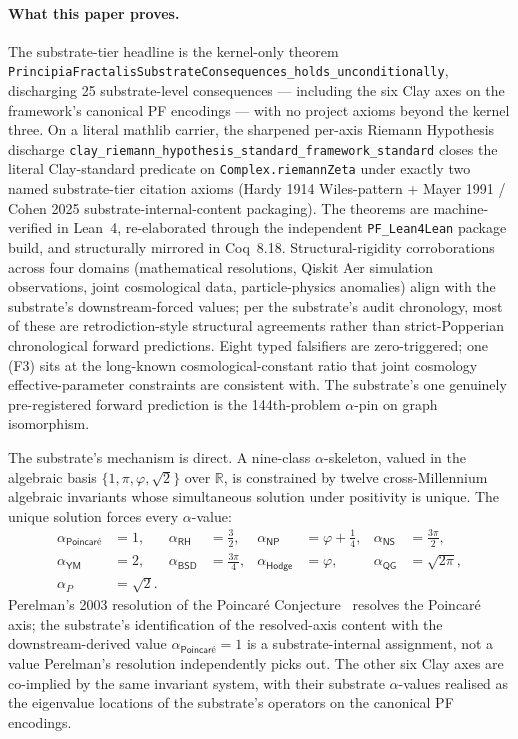 \documentclass[11pt,a4paper]{amsart}
\theoremstyle{plain}
\theoremstyle{definition}
\begin{document}
\paragraph{What this paper proves.} The substrate-tier headline is the kernel-only theorem \texttt{PrincipiaFractalisSubstrateConsequences\_holds\_unconditionally}, discharging 25 substrate-level consequences --- including the six Clay axes on the framework's canonical PF encodings --- with no project axioms beyond the kernel three. On a literal mathlib carrier, the sharpened per-axis Riemann Hypothesis discharge \texttt{clay\_riemann\_hypothesis\_standard\_framework\_standard} closes the literal Clay-standard predicate on \texttt{Complex.riemannZeta} under exactly two named substrate-tier citation axioms (Hardy 1914 Wiles-pattern + Mayer 1991 / Cohen 2025 substrate-internal-content packaging). The theorems are machine-verified in Lean~4, re-elaborated through the independent \texttt{PF\_Lean4Lean} package build, and structurally mirrored in Coq~8.18. Structural-rigidity corroborations across four domains (mathematical resolutions, Qiskit Aer simulation observations, joint cosmological data, particle-physics anomalies) align with the substrate's downstream-forced values; per the substrate's audit chronology, most of these are retrodiction-style structural agreements rather than strict-Popperian chronological forward predictions. Eight typed falsifiers are zero-triggered; one (F3) sits at the long-known cosmological-constant ratio that joint cosmology effective-parameter constraints are consistent with. The substrate's one genuinely pre-registered forward prediction is the 144th-problem $\alpha$-pin on graph isomorphism.

The substrate's mechanism is direct. A nine-class $\alpha$-skeleton, valued in the algebraic basis $\{1,\pi,\varphi,\sqrt{2}\}$ over $\mathbb{R}$, is constrained by twelve cross-Millennium algebraic invariants whose simultaneous solution under positivity is unique. The unique solution forces every $\alpha$-value:
\[
\begin{aligned}
\alpha_{\textsf{Poincar\'e}} &= 1, &
\alpha_{\textsf{RH}} &= \tfrac{3}{2}, &
\alpha_{\textsf{NP}} &= \varphi + \tfrac{1}{4}, &
\alpha_{\textsf{NS}} &= \tfrac{3\pi}{2},\\
\alpha_{\textsf{YM}} &= 2, &
\alpha_{\textsf{BSD}} &= \tfrac{3\pi}{4}, &
\alpha_{\textsf{Hodge}} &= \varphi, &
\alpha_{\textsf{QG}} &= \sqrt{2\pi},\\
\alpha_{P} &= \sqrt{2}. & & & & & &
\end{aligned}
\]
Perelman's 2003 resolution of the Poincar\'e Conjecture~\cite{perelman2003} resolves the Poincar\'e axis; the substrate's identification of the resolved-axis content with the downstream-derived value $\alpha_{\textsf{Poincar\'e}}=1$ is a substrate-internal assignment, not a value Perelman's resolution independently picks out. The other six Clay axes are co-implied by the same invariant system, with their substrate $\alpha$-values realised as the eigenvalue locations of the substrate's operators on the canonical PF encodings.
\end{document}
